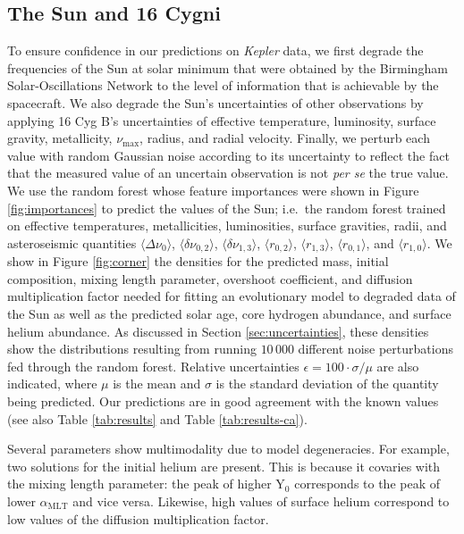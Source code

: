\documentclass[twocolumn,twocolappendix]{aastex6}
\newif\ifref
\newcommand{\mb}[1]{\ifref\boldmath\textbf{#1}\unboldmath\else #1\fi}
\begin{document}
\subsection{The Sun and 16 Cygni}
To ensure confidence in our predictions on \emph{Kepler} data, we first degrade the frequencies of the Sun at solar minimum that were obtained by the Birmingham Solar-Oscillations Network \citep[BiSON;][]{2014MNRAS.439.2025D} to the level of information that is achievable by the spacecraft. We also degrade the Sun's uncertainties of \mb{other} observations by applying 16 Cyg B's uncertainties of effective temperature, luminosity, surface gravity, metallicity, $\nu_{\max}$, radius, and radial velocity. Finally, we perturb each value with random Gaussian noise according to its uncertainty to reflect the fact that the measured value of an uncertain observation is not \emph{per se} the true value. We use the random forest whose feature importances were shown in Figure \ref{fig:importances} to predict the values of the Sun; i.e.\ the random forest trained on effective temperatures, metallicities, luminosities, surface gravities, radii, and asteroseismic \mb{quantities} $\langle \Delta\nu_0 \rangle$, $\langle \delta\nu_{0,2} \rangle$, $\langle \delta\nu_{1,3} \rangle$, $\langle r_{0,2} \rangle$, $\langle r_{1,3} \rangle$, $\langle r_{0,1} \rangle$, and $\langle r_{1,0} \rangle$. We show in Figure \ref{fig:corner} the densities for the predicted mass, initial composition, mixing length parameter, overshoot coefficient, and diffusion multiplication factor needed for fitting an evolutionary model to degraded data of the Sun as well as the predicted solar age, core hydrogen abundance, and surface helium abundance. \mb{As discussed in Section \ref{sec:uncertainties}, these densities show the distributions resulting from running $10\,000$ different noise perturbations fed through the random forest.} Relative uncertainties $\epsilon=100\cdot\sigma/\mu$ are also indicated, where $\mu$ is the mean and $\sigma$ is the standard deviation of the quantity being predicted. Our predictions are in good agreement with the known values (see also Table \ref{tab:results} and Table \ref{tab:results-ca}). 

Several parameters show multimodality due to model degeneracies. For example, two solutions for the initial helium are present. This is because it covaries with the mixing length parameter: the peak of \mb{higher} Y$_0$ corresponds to the peak of \mb{lower} $\alpha_{\text{MLT}}$ and vice versa. Likewise, high values of surface helium correspond to low values of the diffusion \mb{multiplication} factor. 
\end{document}

